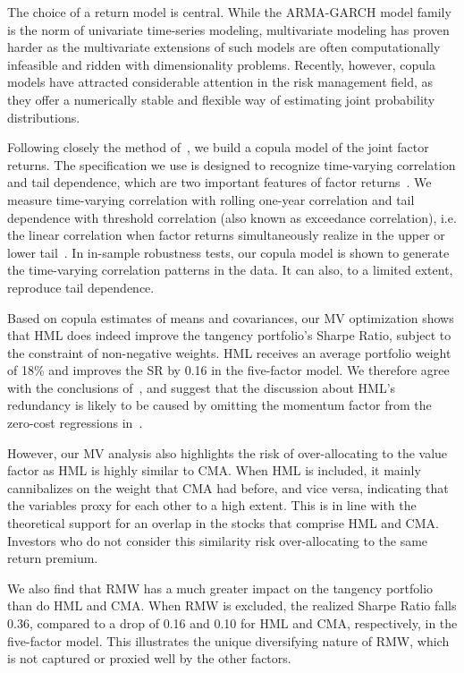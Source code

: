 The choice of a return model is central. While the ARMA-GARCH model family is the norm of univariate time-series modeling, multivariate modeling has proven harder as the multivariate extensions of such models are often computationally infeasible and ridden with dimensionality problems. Recently, however, copula models have attracted considerable attention in the risk management field, as they offer a numerically stable and flexible way of estimating joint probability distributions. 

Following closely the method of~\textcite{ChristoffersenLanglois2013}, we build a copula model of the joint factor returns. The specification we use is designed to recognize time-varying correlation and tail dependence, which are two important features of factor returns~\autocite{ChristoffersenLanglois2013}. We measure time-varying correlation with rolling one-year correlation and tail dependence with threshold correlation (also known as exceedance correlation), i.e. the linear correlation when factor returns simultaneously realize in the upper or lower tail~\autocite{AngChen2002}. In in-sample robustness tests, our copula model is shown to generate the time-varying correlation patterns in the data. It can also, to a limited extent, reproduce tail dependence.

Based on copula estimates of means and covariances, our MV optimization shows that HML does indeed improve the tangency portfolio's Sharpe Ratio, subject to the constraint of non-negative weights. HML receives an average portfolio weight of 18\% and improves the SR by 0.16 in the five-factor model. We therefore agree with the conclusions of~\textcite{Asness2015}, and suggest that the discussion about HML's redundancy is likely to be caused by omitting the momentum factor from the zero-cost regressions in~\textcite{FF2015}.

However, our MV analysis also highlights the risk of over-allocating to the value factor as HML is highly similar to CMA. When HML is included, it mainly cannibalizes on the weight that CMA had before, and vice versa, indicating that the variables proxy for each other to a high extent. This is in line with the theoretical support for an overlap in the stocks that comprise HML and CMA. Investors who do not consider this similarity risk over-allocating to the same return premium.

We also find that RMW has a much greater impact on the tangency portfolio than do HML and CMA. When RMW is excluded, the realized Sharpe Ratio falls 0.36, compared to a drop of 0.16 and 0.10 for HML and CMA, respectively, in the five-factor model. This illustrates the unique diversifying nature of RMW, which is not captured or proxied well by the other factors.

